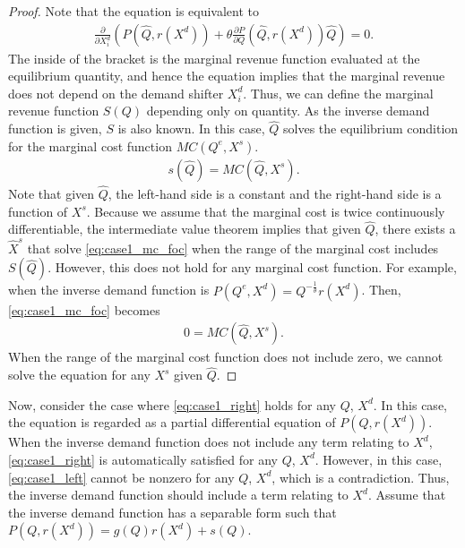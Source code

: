 \documentclass[11pt, a4paper]{article}
\theoremstyle{remark}
\begin{document}
\begin{proof}
    Note that the equation is equivalent to
    \begin{align}
        \frac{\partial}{\partial X^{d}_i}\left( P(\hat{Q}, r(X^{d})) + \theta\frac{\partial P}{\partial Q}(\hat{Q}, r(X^{d}))\hat{Q}\right) = 0.
    \end{align}
    The inside of the bracket is the marginal revenue function evaluated at the equilibrium quantity, and hence the equation implies that the marginal revenue does not depend on the demand shifter $X^{d}_i$.
    Thus, we can define the marginal revenue function $S(Q)$ depending only on quantity.
    As the inverse demand function is given, $S$ is also known.
    In this case, $\hat{Q}$ solves the equilibrium condition for the marginal cost function $MC(Q^e, X^{s})$.
    \begin{align}
        s(\hat{Q}) =  MC(\hat{Q}, X^{s}). \label{eq:case1_mc_foc}
    \end{align}
    Note that given $\hat{Q}$, the left-hand side is a constant and the right-hand side is a function of $X^{s}$.
    Because we assume that the marginal cost is twice continuously differentiable, the intermediate value theorem implies that given $\hat{Q}$, there exists a $\hat{X}^{s}$ that solve \eqref{eq:case1_mc_foc} when the range of the marginal cost includes $S(\hat{Q})$.    
    However, this does not hold for any marginal cost function.
    For example, when the inverse demand function is $P(Q^e, X^{d}) = Q^{-\frac{1}{\theta}}r(X^{d})$.
    Then, \eqref{eq:case1_mc_foc} becomes
    \begin{align}
        0 = MC(\hat{Q}, X^{s}).
    \end{align}
    When the range of the marginal cost function does not include zero, we cannot solve the equation for any $X^{s}$ given $\hat{Q}$.
\end{proof}



Now, consider the case where \eqref{eq:case1_right} holds for any $Q$, $X^{d}$.
In this case, the equation is regarded as a partial differential equation of $P(Q, r(X^{d}))$.
When the inverse demand function does not include any term relating to $X^{d}$, \eqref{eq:case1_right} is automatically satisfied for any $Q$, $X^{d}$.
However, in this case, \eqref{eq:case1_left} cannot be nonzero for any $Q$, $X^{d}$, which is a contradiction.
Thus, the inverse demand function should include a term relating to $X^{d}$.
Assume that the inverse demand function has a separable form such that $P(Q, r(X^{d})) = g(Q)r(X^{d}) + s(Q)$.
\end{document}
